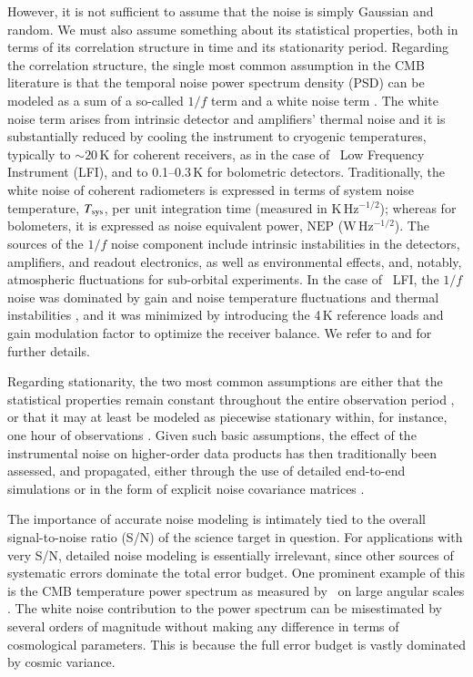 \documentclass{aa}
\begin{document}
However, it is not sufficient to assume that the noise is simply
Gaussian and random. We must also assume something about its
statistical properties, both in terms of its correlation structure in
time and its stationarity period. Regarding the correlation structure,
the single most common assumption in the CMB literature is that the
temporal noise power spectrum density (PSD) can be modeled as a sum
of a so-called $1/f$ term and a white noise term
\citep[e.g.,][]{bennett2012,planck2016-l02,planck2016-l03}. The white
noise term arises from intrinsic detector and amplifiers' thermal
noise and it is substantially reduced by cooling the instrument to
cryogenic temperatures, typically to $\sim$$20$\,K for coherent
receivers, as in the case of \Planck\ Low Frequency Instrument (LFI), and to 0.1--0.3\,K for
bolometric detectors. Traditionally, the white noise of coherent
radiometers is expressed in terms of system noise temperature, $T_{\rm
  sys}$, per unit integration time (measured in K\,Hz$^{-1/2}$); whereas
for bolometers, it is expressed as noise equivalent power,
$\mathrm{NEP}$ (W\,Hz$^{-1/2}$). The sources of the $1/f$ noise
component include intrinsic instabilities in the detectors, amplifiers,
and readout electronics, as well as environmental effects, and,
notably, atmospheric fluctuations for sub-orbital experiments. In the
case of \Planck\ LFI, the $1/f$ noise was dominated by gain and noise
temperature fluctuations and thermal instabilities
\citep{planck2016-l02}, and it was minimized by introducing the 4\,K
reference loads and gain modulation factor to optimize the receiver
balance. We refer to \citet{planck2013-p02,planck2014-a03} and
\citet{bp01} for further details.

Regarding stationarity, the two most common assumptions are either
that the statistical properties remain constant throughout the entire
observation period \citep[e.g.,][]{planck2016-l02}, or that it may at
least be modeled as piecewise stationary within, for instance, one
hour of observations \citep[e.g.,][]{quiet:2011}. Given such basic
assumptions, the effect of the instrumental noise on higher-order data
products has then traditionally been assessed, and propagated, either
through the use of detailed end-to-end simulations
\citep[e.g.,][]{planck2014-a14} or in the form of explicit noise
covariance matrices
\citep[e.g.,][]{tegmark1997,page2007,planck2016-l05}.

The importance of accurate noise modeling is intimately tied to the
overall signal-to-noise ratio (S/N) of the science target in question. For
applications with very S/N, detailed noise
modeling is essentially irrelevant, since other sources of systematic
errors dominate the total error budget. One prominent example of this
is the CMB temperature power spectrum as measured by \Planck\ on large
angular scales \citep{planck2016-l04,planck2016-l05}. The white noise
contribution to the power spectrum can be misestimated by several orders of magnitude without making
any difference in terms of cosmological parameters. This is because the full
error budget is vastly dominated by cosmic variance.
\end{document}
